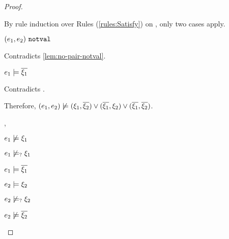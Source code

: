 \begin{proof}
\begin{byCases}
\begin{byCases}
\begin{byCases}
\begin{byCases}
\begin{byCases}
\begin{pfsteps*}
                    \end{pfsteps*}
                    By rule induction over Rules (\ref{rules:Satisfy}) on , only two cases apply.
                   \begin{byCases}
                    \item[\text{(\ref{rule:CSNotValPair})}]
                        \begin{pfsteps*}
                        \item $(e_1 , e_2) ~\mathtt{notval}$ 
                        \end{pfsteps*}
                        Contradicts \autoref{lem:no-pair-notval}.
                    \item[\text{(\ref{rule:CSPair})}]
                        \begin{pfsteps*}
                        \item $e_1 \models \overline{\xi_1}$ 
                        \end{pfsteps*}
                        Contradicts .
                    \end{byCases}
                \end{byCases}
            \end{byCases}
            Therefore, $(e_1 , e_2) \not\models (\xi_1 , \overline{\xi_2}) \vee (\overline{\xi_1} , \xi_2) \vee (\overline{\xi_1} , \overline{\xi_2})$.
            
        \item[\csatisfy{e_1}{\cdual{\xi_1}},\csatisfy{e_2}{\xi_2}]
            \begin{pfsteps*}
            \item $e_1 \not\models \xi_1$  
            \item $e_1 \not\models_{?} \xi_1$  
            \item $e_1 \models \overline{\xi_1}$  
            \item $e_2 \models \xi_2$  
            \item $e_2 \not\models_{?} \xi_2$  
            \item $e_2 \not\models \overline{\xi_2}$  
            \end{pfsteps*}
            

\end{byCases}
\end{byCases}
\end{byCases}
\end{proof}
